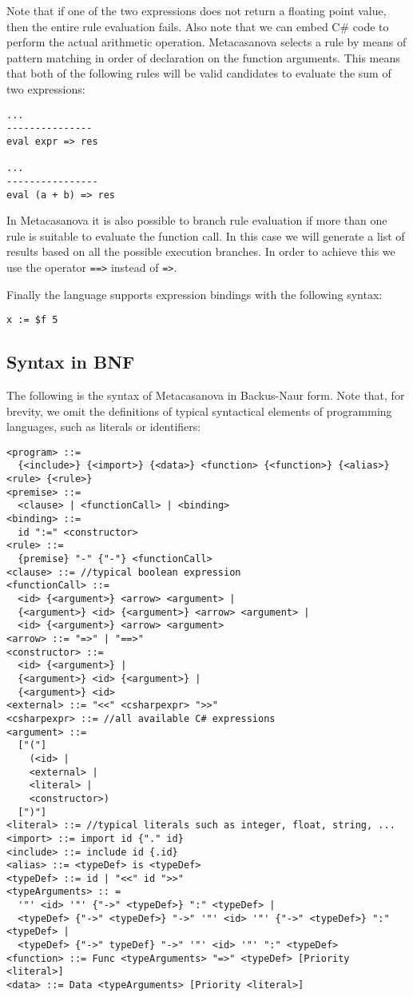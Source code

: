 \noindent
Note that if one of the two expressions does not return a floating point value, then the entire rule evaluation fails. Also note that we can embed C\# code to perform the actual arithmetic operation. Metacasanova selects a rule by means of pattern matching in order of declaration on the function arguments. This means that both of the following rules will be valid candidates to evaluate the sum of two expressions:

\begin{lstlisting}
...
---------------
eval expr => res

...
----------------
eval (a + b) => res
\end{lstlisting} 

In Metacasanova it is also possible to branch rule evaluation if more than one rule is suitable to evaluate the function call. In this case we will generate a list of results based on all the possible execution branches. In order to achieve this we use the operator \texttt{==>} instead of \texttt{=>}.

Finally the language supports expression bindings with the following syntax:

\begin{lstlisting}
x := $f 5
\end{lstlisting}

\subsection{Syntax in BNF}
The following is the syntax of Metacasanova in Backus-Naur form. Note that, for brevity, we omit the definitions of typical syntactical elements of programming languages, such as literals or identifiers:

\begin{lstlisting}
<program> ::= 
  {<include>} {<import>} {<data>} <function> {<function>} {<alias>} <rule> {<rule>}
<premise> ::= 
  <clause> | <functionCall> | <binding>
<binding> ::= 
  id ":=" <constructor>
<rule> ::= 
  {premise} "-" {"-"} <functionCall>
<clause> ::= //typical boolean expression
<functionCall> ::= 
  <id> {<argument>} <arrow> <argument> | 
  {<argument>} <id> {<argument>} <arrow> <argument> | 
  <id> {<argument>} <arrow> <argument>
<arrow> ::= "=>" | "==>"
<constructor> ::= 
  <id> {<argument>} | 
  {<argument>} <id> {<argument>} | 
  {<argument>} <id>
<external> ::= "<<" <csharpexpr> ">>"
<csharpexpr> ::= //all available C# expressions
<argument> ::= 
  ["("] 
    (<id> | 
    <external> | 
    <literal> | 
    <constructor>) 
  [")"]
<literal> ::= //typical literals such as integer, float, string, ...
<import> ::= import id {"." id}
<include> ::= include id {.id}
<alias> ::= <typeDef> is <typeDef>
<typeDef> ::= id | "<<" id ">>"
<typeArguments> :: = 
  '"' <id> '"' {"->" <typeDef>} ":" <typeDef> |
  <typeDef> {"->" <typeDef>} "->" '"' <id> '"' {"->" <typeDef>} ":" <typeDef> |
  <typeDef> {"->" typeDef} "->" '"' <id> '"' ":" <typeDef> 
<function> ::= Func <typeArguments> "=>" <typeDef> [Priority <literal>]
<data> ::= Data <typeArguments> [Priority <literal>]
\end{lstlisting}


